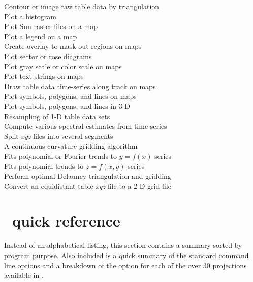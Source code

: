 \begin{tabbing}
	\>	Contour or image raw table data by triangulation \\ 
	\>	Plot a histogram \\ 
	\>	Plot Sun raster files on a map \\ 
	\>	Plot a legend on a map \\ 
	\>	Create overlay to mask out regions on maps \\ 
	\>	Plot sector or rose diagrams \\ 
	\>	Plot gray scale or color scale on maps \\ 
	\>	Plot text strings on maps \\ 
	\>	Draw table data time-series along track on maps \\ 
		\>	Plot symbols, polygons, and lines on maps \\ 
		\>	Plot symbols, polygons, and lines in 3-D \\ 
	\>	Resampling of 1-D table data sets \\ 
	\>	Compute various spectral estimates from time-series \\ 
	\>	Split \emph{xyz} files into several segments \\ 
	\>	A continuous curvature gridding algorithm \\ 
	\>	Fits polynomial or Fourier trends to $y = f(x)$ series \\ 
	\>	Fits polynomial trends to $z = f(x,y)$ series \\ 
	\>	Perform optimal Delauney triangulation and gridding \\ 
	\>	Convert an equidistant table \emph{xyz} file to a 2-D grid file
\end{tabbing}

\section{\gmt\ quick reference}
\label{sec:purpose}
Instead of an alphabetical listing, this section contains a summary
sorted by program purpose.  Also included is a quick summary of the
standard command line options and a breakdown of the  option
for each of the over 30 projections available in \GMT. \\

